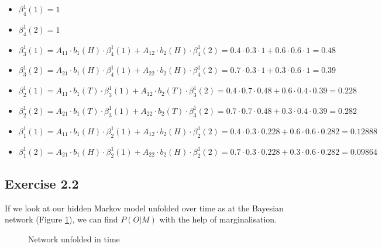 \documentclass[11pt,a4paper]{article}
\begin{document}
	\begin{itemize}
		\item $ \beta_4^1(1) = 1 $
		\item $ \beta_4^1(2) = 1 $
		\item $ \beta_3^1(1) = A_{11} \cdot b_1(H) \cdot \beta_4^1(1) +  A_{12} \cdot b_2(H) \cdot \beta_4^1(2) = 0.4 \cdot 0.3 \cdot 1 + 0.6 \cdot 0.6 \cdot 1 = 0.48$
		\item $ \beta_3^1(2) = A_{21} \cdot b_1(H) \cdot \beta_4^1(1) +  A_{22} \cdot b_2(H) \cdot \beta_4^1(2) = 0.7 \cdot 0.3 \cdot 1 + 0.3 \cdot 0.6 \cdot 1 = 0.39$
		\item $ \beta_2^1(1) = A_{11} \cdot b_1(T) \cdot \beta_3^1(1) +  A_{12} \cdot b_2(T) \cdot \beta_3^1(2) = 0.4 \cdot 0.7 \cdot 0.48 + 0.6 \cdot 0.4 \cdot 0.39 = 0.228$
		\item $ \beta_2^1(2) = A_{21} \cdot b_1(T) \cdot \beta_3^1(1) +  A_{22} \cdot b_2(T) \cdot \beta_3^1(2) = 0.7 \cdot 0.7 \cdot 0.48 + 0.3 \cdot 0.4 \cdot 0.39 = 0.282$
		\item $ \beta_1^1(1) = A_{11} \cdot b_1(H) \cdot \beta_2^1(1) +  A_{12} \cdot b_2(H) \cdot \beta_2^1(2) = 0.4 \cdot 0.3 \cdot 0.228 + 0.6 \cdot 0.6 \cdot 0.282 = 0.12888$
		\item $ \beta_1^1(2) = A_{21} \cdot b_1(H) \cdot \beta_2^1(1) +  A_{22} \cdot b_2(H) \cdot \beta_2^1(2) = 0.7 \cdot 0.3 \cdot 0.228 + 0.3 \cdot 0.6 \cdot 0.282 = 0.09864$
	\end{itemize}
	
	\subsection*{Exercise 2.2}
	
	If we look at our hidden Markov model unfolded over time as at the Bayesian network (Figure \ref{fig:network}), we can find $P(O | M) $ with the help of marginalisation.
	
	\begin{figure}[H]
		\caption{Network unfolded in time}
		\label{fig:network}
	\end{figure}
	
\end{document}
